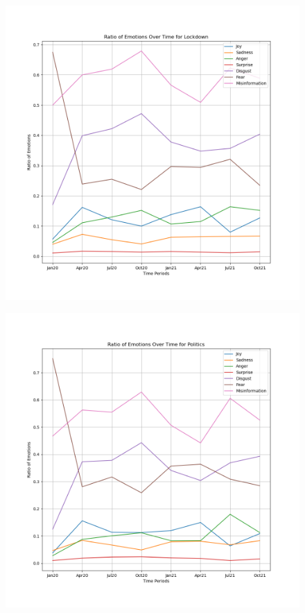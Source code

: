\documentclass{l4proj}
\begin{document}
\begin{appendices}
\begin{figure}[H]
\begin{minipage}[c]{0.49\linewidth}
\centering
\includegraphics[width=\textwidth]{images/LockdownEmotion.png}
\label{fig:lockemo}
\end{minipage}
\begin{minipage}[c]{0.49\linewidth}
\centering
\includegraphics[width=\textwidth]{images/PoliticsEmotion.png}
\label{fig:polemo}
\end{minipage}
\end{figure}

\end{appendices}
\end{document}
